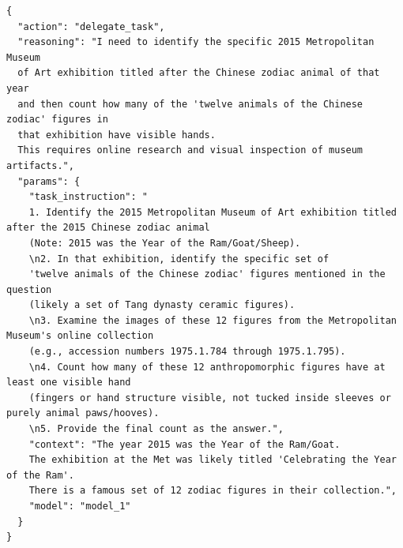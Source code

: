 \begin{tcolorbox}[
  title={\textbf{\small Attempt 1 - Main Decision}},
  boxrule=1pt,
  arc=0mm,
  colback=gray!5,
  colframe=gray!70,
  breakable,
  before skip=10pt,
  after skip=10pt,
  pad at break=2mm,
  parbox=false
]
\begin{verbatim}
{
  "action": "delegate_task",
  "reasoning": "I need to identify the specific 2015 Metropolitan Museum 
  of Art exhibition titled after the Chinese zodiac animal of that year 
  and then count how many of the 'twelve animals of the Chinese zodiac' figures in
  that exhibition have visible hands. 
  This requires online research and visual inspection of museum artifacts.",
  "params": {
    "task_instruction": "
    1. Identify the 2015 Metropolitan Museum of Art exhibition titled after the 2015 Chinese zodiac animal 
    (Note: 2015 was the Year of the Ram/Goat/Sheep).
    \n2. In that exhibition, identify the specific set of 
    'twelve animals of the Chinese zodiac' figures mentioned in the question 
    (likely a set of Tang dynasty ceramic figures).
    \n3. Examine the images of these 12 figures from the Metropolitan Museum's online collection 
    (e.g., accession numbers 1975.1.784 through 1975.1.795).
    \n4. Count how many of these 12 anthropomorphic figures have at least one visible hand 
    (fingers or hand structure visible, not tucked inside sleeves or purely animal paws/hooves).
    \n5. Provide the final count as the answer.",
    "context": "The year 2015 was the Year of the Ram/Goat. 
    The exhibition at the Met was likely titled 'Celebrating the Year of the Ram'.
    There is a famous set of 12 zodiac figures in their collection.",
    "model": "model_1"
  }
}
\end{verbatim}
\end{tcolorbox}

